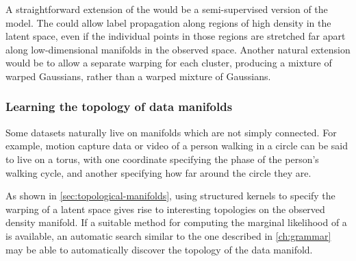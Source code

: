 A straightforward extension of the \iwmm{} would be a semi-supervised version of the model.
The \iwmm{} could allow label propagation along regions of high density in the latent space, even if the individual points in those regions are stretched far apart along low-dimensional manifolds in the observed space.
Another natural extension would be to allow a separate warping for each cluster, producing a mixture of warped Gaussians, rather than a warped mixture of Gaussians.%




\subsubsection{Learning the topology of data manifolds}

Some datasets naturally live on manifolds which are not simply connected.
For example, motion capture data or video of a person walking in a circle can be said to live on a torus, with one coordinate specifying the phase of the person's walking cycle, and another specifying how far around the circle they are.

As shown in \cref{sec:topological-manifolds}, using structured kernels to specify the warping of a latent space gives rise to interesting topologies on the observed density manifold.
If a suitable method for computing the marginal likelihood of a \gplvm{} is available, an automatic search similar to the one described in \cref{ch:grammar} may be able to automatically discover the topology of the data manifold.





%
%


